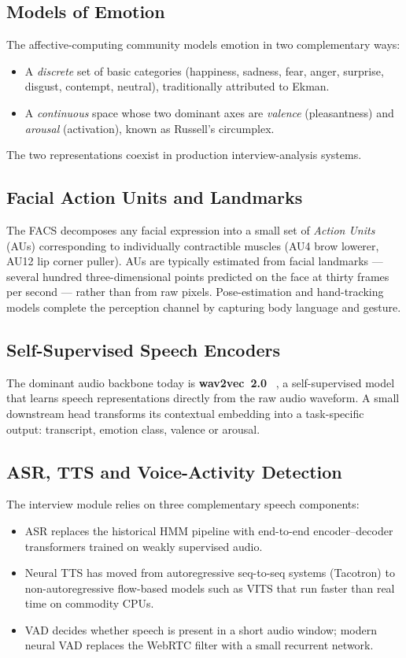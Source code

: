 \subsection{Models of Emotion}
The affective-computing community models emotion in two complementary
ways:
\begin{itemize}
    \item A \emph{discrete} set of basic categories (happiness,
        sadness, fear, anger, surprise, disgust, contempt, neutral),
        traditionally attributed to Ekman.
    \item A \emph{continuous} space whose two dominant axes are
        \emph{valence} (pleasantness) and \emph{arousal} (activation),
        known as Russell's circumplex.
\end{itemize}
\noindent The two representations coexist in production
interview-analysis systems.

\subsection{Facial Action Units and Landmarks}
The \acs{FACS} decomposes any facial expression into a small set of
\emph{Action Units} (\acsp{AU}) corresponding to individually
contractible muscles (AU4 brow lowerer, AU12 lip corner puller). AUs
are typically estimated from facial landmarks --- several hundred
three-dimensional points predicted on the face at thirty frames per
second --- rather than from raw pixels. Pose-estimation and
hand-tracking models complete the perception channel by capturing body
language and gesture.

\subsection{Self-Supervised Speech Encoders}
The dominant audio backbone today is \textbf{wav2vec~2.0}
~\cite{baevski2020wav2vec}, a self-supervised model that learns
speech representations directly from the raw audio waveform. A small
downstream head transforms its contextual embedding into a
task-specific output: transcript, emotion class, valence or arousal.

\subsection{ASR, TTS and Voice-Activity Detection}
The interview module relies on three complementary speech components:
\begin{itemize}
    \item \acs{ASR} replaces the historical \acs{HMM} pipeline with
        end-to-end encoder--decoder transformers trained on weakly
        supervised audio.
    \item Neural \acs{TTS} has moved from autoregressive seq-to-seq
        systems (Tacotron) to non-autoregressive flow-based models
        such as VITS that run faster than real time on commodity
        \acsp{CPU}.
    \item \acs{VAD} decides whether speech is present in a short audio
        window; modern neural VAD replaces the WebRTC filter with a
        small recurrent network.
\end{itemize}

